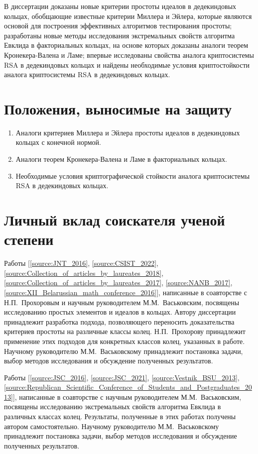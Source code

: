 \documentclass[_00_dissertation.tex]{subfiles}
\begin{document}
В диссертации доказаны новые критерии простоты идеалов в дедекиндовых кольцах, обобщающие известные критерии Миллера и Эйлера, которые являются основой для построения эффективных алгоритмов тестирования простоты; разработаны новые методы исследования экстремальных свойств алгоритма Евклида в факториальных кольцах, на основе которых доказаны аналоги теорем Кронекера-Валена и Ламе; впервые исследованы свойства аналога криптосистемы RSA в дедекиндовых кольцах и найдены необходимые условия криптостойкости аналога криптосистемы RSA в дедекиндовых кольцах.

\section*{Положения, выносимые на защиту}

\begin{enumerate}
    \item Аналоги критериев Миллера и Эйлера простоты идеалов в дедекиндовых кольцах с конечной нормой.
    
    \item Аналоги теорем Кронекера-Валена и Ламе в факториальных кольцах.
    
    \item Необходимые условия криптографической стойкости аналога криптосистемы RSA в дедекиндовых кольцах.
\end{enumerate}

\section*{Личный вклад соискателя ученой степени}

Работы [\ref{source:JNT_2016}, \ref{source:CSIST_2022}, \ref{source:Collection_of_articles_by_laureates_2018}, \ref{source:Collection_of_articles_by_laureates_2017}, \ref{source:NANB_2017}, \ref{source:XII_Belarussian_math_conference_2016}], написанные в соавторстве с Н.П.~Прохоровым и научным руководителем М.М.~Васьковским, посвящены исследованию простых элементов и идеалов в кольцах.
Автору диссертации принадлежит разработка подхода, позволяющего переносить доказательства критериев простоты на различные классы колец.
Н.П.~Прохорову принадлежит применение этих подходов для конкретных классов колец, указанных в работе.
Научному руководителю М.М.~Васьковскому принадлежит постановка задачи, выбор методов исследования и обсуждение полученных результатов.

Работы [\ref{source:JSC_2016}, \ref{source:JSC_2021}, \ref{source:Vestnik_BSU_2013}, \ref{source:Republican_Scientific_Conference_of_Students_and_Postgraduates_2013}], написанные в соавторстве с научным руководителем М.М.~Васьковским, посвящены исследованию экстремальных свойств алгоритма Евклида в различных  классах колец.
Результаты, полученные  в этих работах получены  автором самостоятельно.
Научному руководителю М.М.~Васьковскому принадлежит постановка задачи, выбор методов исследования и обсуждение полученных результатов.
\end{document}
